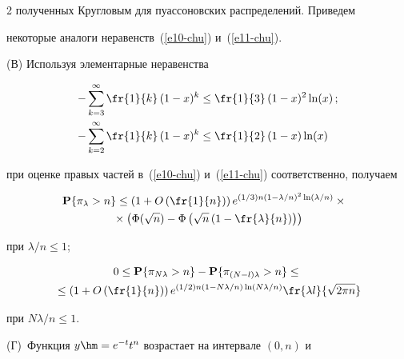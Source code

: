 \begin{multicols}{2}
полученных Кругловым для пуассоновских распределений. Приведем


некоторые аналоги неравенств~(\ref{e10-chu}) и~(\ref{e11-chu}).





(В) Используя элементарные неравенства


\begin{align*}


-\sum\limits_{k=3}^{\infty}\fr{1}{k}\,(1-x)^k&\le \fr{1}{3}\,(1-x)^2\ln(x)\,;\\


-\sum\limits_{k=2}^{\infty}\fr{1}{k}\,(1-x)^k&\le \fr{1}{2}\,(1-x)\ln(x)


\end{align*}


при оценке правых частей в~(\ref{e10-chu}) и~(\ref{e11-chu}) соответственно, получаем


\begin{multline*}


\!\!\!\mathbf{P}\{\pi_{\lambda}>n\}\le\left(1+O\left(\fr{1}{n}\right)\right)


e^{({1}/{3})n\left(1-{\lambda}/{n}\right)^2\ln\left(\lambda/n\right)}\times{}\\


{}\times


\left(\Phi(\sqrt{n})-\Phi\left(\sqrt{n}\left(1-\fr{\lambda}{n}\right)\right)\right)


\end{multline*}


при   ${\lambda}/{n}\le 1$;


\begin{multline*}


0\le \mathbf{P}\{\pi_{N\lambda}>n\}-\mathbf{P}\{\pi_{(N-l)\lambda}>n\}\le{}\\


{}\le


\left(1+O\left(\fr{1}{n}\right)\right)e^{({1}/{2})n\left(1-{N\lambda}/{n}\right)


\ln\left({N\lambda}/{n}\right)}


\fr{\lambda l}{\sqrt{2\pi n}}


\end{multline*}


при   ${N\lambda}/{n}\le 1$.





(Г)~Функция $y\hm=e^{-t}t^n$ возрастает на интервале $(0, n)$ и



\end{multicols}
